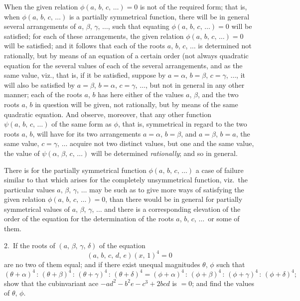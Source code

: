 \documentclass[11pt,a4paper]{book}
\begin{document}
When the given relation $\phi(a,\,b,\,c,\,\ldots) = 0$ is not of the required form; that is,
when $\phi(a,\,b,\,c,\,\ldots)$ is a partially symmetrical function, there will be in general several
arrangements of $a$, $\beta$, $\gamma$, $\ldots$, such that equating $\phi(a,\,b,\,c,\,\ldots) = 0$ will be satisfied; for
each of these arrangements, the given relation $\phi(a,\,b,\,c,\,\ldots) = 0$ will be satisfied; and
it follows that each of the roots $a$, $b$, $c$, $\ldots$ is determined not rationally, but by means
of an equation of a certain order (not always quadratic equation for the several values
of each of the several arrangements, and as the same value, viz., that is,
if it be satisfied, suppose by $a = \alpha$, $b = \beta$, $c = \gamma$, $\ldots$, it will also be satisfied by $a = \beta$,
$b = \alpha$, $c = \gamma$, $\ldots$, but not in general in any other manner; each of the roots $a$, $b$ has
here either of the values $a$, $\beta$, and the two roots $a$, $b$ in question will be given, not
rationally, but by means of the same quadratic equation. And observe, moreover, that
any other function $\psi(a,\,b,\,c,\,\ldots)$ of the same form as $\phi$, that is, symmetrical in regard
to the two roots $a$, $b$, will have for its two arrangements $a = \alpha$, $b = \beta$, and $a = \beta$,
$b = a$, the same value, $c = \gamma$, $\ldots$ acquire not two distinct values, but one and the same value,
the value of $\psi(\alpha,\,\beta,\,c,\,\ldots)$ will be determined \textit{rationally}; and so in general.

There is for the partially symmetrical function $\phi(a,\,b,\,c,\,\ldots)$ a case of failure
similar to that which arises for the completely unsymmetrical function, viz.\ the particular
values $a$, $\beta$, $\gamma$, $\ldots$ may be such as to give more ways of satisfying the given relation
$\phi(a,\,b,\,c,\,\ldots) = 0$, than there would be in general for partially symmetrical values of $a$, $\beta$, $\gamma$, $\ldots$
and there is a corresponding elevation of the order of the equation for the
determination of the roots $a$, $b$, $c$, $\ldots$\ or some of them.

\smallskip
\noindent\textsc{2.}\, If the roots of $(a,\,\beta,\,\gamma,\,\delta)$ of the equation
\[
(a,\,b,\,c,\,d,\,e)(x,\,1)^4 = 0
\]
are no two of them equal; and if there exist unequal magnitudes $\theta$, $\phi$ such that
\[
(\theta+\alpha)^4\,:\,(\theta+\beta)^4\,:\,(\theta+\gamma)^4\,:\,(\theta+\delta)^4 = (\phi+\alpha)^4\,:\,(\phi+\beta)^4\,:\,(\phi+\gamma)^4\,:\,(\phi+\delta)^4;
\]
show that the cubinvariant ace $-ad^2 - b^2e - c^3 + 2bcd$ is $= 0$; and find the values of $\theta$, $\phi$.
\end{document}
